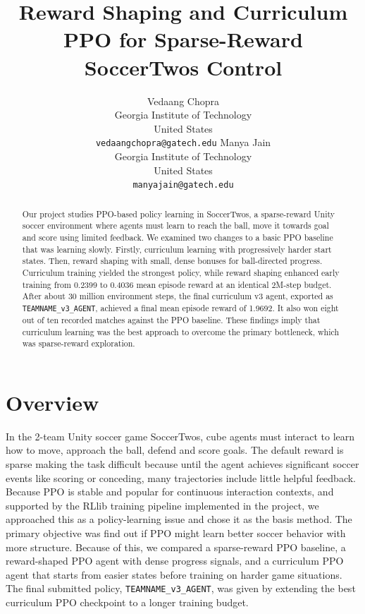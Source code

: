 \documentclass{article}
\title{Reward Shaping and Curriculum PPO for Sparse-Reward SoccerTwos Control}
\author{
  Vedaang Chopra\\
  Georgia Institute of Technology\\
  United States\\
  \texttt{vedaangchopra@gatech.edu}
  \And
  Manya Jain\\
  Georgia Institute of Technology\\
  United States\\
  \texttt{manyajain@gatech.edu}
}
\begin{document}
\maketitle

\begin{abstract}
  Our project studies PPO-based policy learning in SoccerTwos, a sparse-reward Unity soccer environment where agents must learn to reach the ball, move it towards goal and score using limited feedback. We examined two changes to a basic PPO baseline that was learning slowly. Firstly, curriculum learning with progressively harder start states. Then, reward shaping with small, dense bonuses for ball-directed progress. Curriculum training yielded the strongest policy, while reward shaping enhanced early training from 0.2399 to 0.4036 mean episode reward at an identical 2M-step budget. After about 30 million environment steps, the final curriculum v3 agent, exported as \texttt{TEAMNAME\_v3\_AGENT}, achieved a final mean episode reward of 1.9692. It also won eight out of ten recorded matches against the PPO baseline. These findings imply that curriculum learning was the best approach to overcome the primary bottleneck, which was sparse-reward exploration.
\end{abstract}

\section{Overview}

In the 2-team Unity soccer game SoccerTwos, cube agents must interact to learn
how to move, approach the ball, defend and score goals. The default reward is
sparse making the task difficult because until the agent achieves significant
soccer events like scoring or conceding, many trajectories include little
helpful feedback. Because PPO is stable and popular for continuous interaction
contexts, and supported by the RLlib training pipeline implemented in the
project, we approached this as a policy-learning issue and chose it as the
basis method. The primary objective was find out if PPO might learn better
soccer behavior with more structure. Because of this, we compared a
sparse-reward PPO baseline, a reward-shaped PPO agent with dense progress
signals, and a curriculum PPO agent that starts from easier states before
training on harder game situations. The final submitted policy,
\texttt{TEAMNAME\_v3\_AGENT}, was given by extending the best curriculum PPO
checkpoint to a longer training budget.
\end{document}
